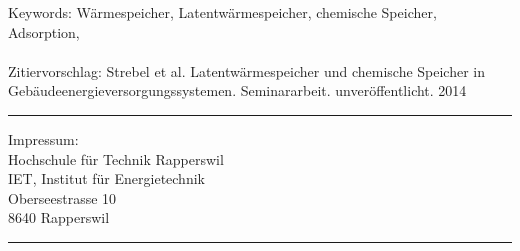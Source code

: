  \vspace*{12.5cm}
\begin{minipage}{80mm}
	Keywords: Wärmespeicher, Latentwärmespeicher, chemische Speicher, Adsorption,
 \\
	\\
	Zitiervorschlag: 
	Strebel et al. Latentwärmespeicher und chemische Speicher in
	Gebäudeenergieversorgungssystemen. Seminararbeit. unveröffentlicht. 2014
	\vspace{1cm}


  \rule{80mm}{2pt}
  Impressum: \\
  Hochschule für Technik Rapperswil \\
  IET, Institut für Energietechnik \\ 
  Oberseestrasse 10 \\
  8640 Rapperswil\\
  \rule{80mm}{2pt}
\end{minipage}
\newpage

